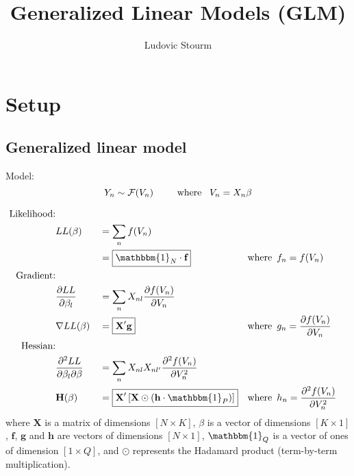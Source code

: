\documentclass[12pt]{article}
\title{Generalized Linear Models (GLM)}
\author{Ludovic Stourm}
\begin{document}
\maketitle



\section{Setup}
\subsection{Generalized linear model}
Model:
\begin{equation}
	Y_n \sim \mathcal{F}(V_n) \hspace*{25pt} \text{where } \hspace*{5pt} V_n = X_n \beta
\end{equation}

\begin{equation}
\begin{aligned}
\text{Likelihood:} \\
	& LL(\beta) && = \sum_n f(V_n) \\
	&  && = \boxed{\mathbbm{1}_N \cdot \textbf{f}}  && \text{where} \hspace*{5pt} f_n = f(V_n) \\
\text{Gradient:} \\
	& \frac{\partial LL}{\partial \beta_l} && = \sum_n X_{nl} \frac{\partial f(V_n)}{\partial V_n} \\
	& \nabla LL(\beta) && = \boxed{\textbf{X}' \textbf{g}} && \text{where} \hspace*{5pt} g_n = \frac{\partial f(V_n)}{\partial V_n} \\
\text{Hessian:} \\
	& \frac{\partial^2 LL}{\partial \beta_l \partial \beta_{}} && = \sum_n X_{nl} X_{nl'} \frac{\partial^2 f(V_n)}{\partial V_n^2} \\
	& \textbf{H}(\beta) && = \boxed{\textbf{X}' \left[ \textbf{X} \odot \left(\textbf{h} \cdot \mathbbm{1}_P \right) \right]}  && \text{where} \hspace*{5pt} h_n = \frac{\partial^2 f(V_n)}{\partial V_n^2} \\
\end{aligned}
\end{equation}
where $\textbf{X}$ is a matrix of dimensions $[N \times K]$, $\beta$ is a vector of dimensions $[K \times 1]$, $\textbf{f}$, $\textbf{g}$ and $\textbf{h}$ are vectors of dimensions $[N \times 1]$, $\mathbbm{1}_Q$ is a vector of ones of dimension $[1 \times Q]$, and $\odot$ represents the Hadamard product (term-by-term multiplication).
\end{document}
